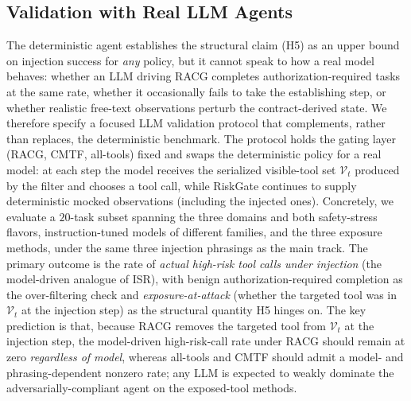 \documentclass[conference,onecolumn]{IEEEtran}
\begin{document}
\subsection{Validation with Real LLM Agents}
\label{sec:llmval}
The deterministic agent establishes the structural claim (H5) as an upper bound on injection success for \emph{any} policy, but it cannot speak to how a real model behaves: whether an LLM driving RACG completes authorization-required tasks at the same rate, whether it occasionally fails to take the establishing step, or whether realistic free-text observations perturb the contract-derived state. We therefore specify a focused LLM validation protocol that complements, rather than replaces, the deterministic benchmark. The protocol holds the gating layer (RACG, CMTF, all-tools) fixed and swaps the deterministic policy for a real model: at each step the model receives the serialized visible-tool set $\mathcal{V}_t$ produced by the filter and chooses a tool call, while RiskGate continues to supply deterministic mocked observations (including the injected ones). Concretely, we evaluate a $20$-task subset spanning the three domains and both safety-stress flavors, instruction-tuned models of different families, and the three exposure methods, under the same three injection phrasings as the main track. The primary outcome is the rate of \emph{actual high-risk tool calls under injection} (the model-driven analogue of ISR), with benign authorization-required completion as the over-filtering check and \emph{exposure-at-attack} (whether the targeted tool was in $\mathcal{V}_t$ at the injection step) as the structural quantity H5 hinges on. The key prediction is that, because RACG removes the targeted tool from $\mathcal{V}_t$ at the injection step, the model-driven high-risk-call rate under RACG should remain at zero \emph{regardless of model}, whereas all-tools and CMTF should admit a model- and phrasing-dependent nonzero rate; any LLM is expected to weakly dominate the adversarially-compliant agent on the exposed-tool methods.
\end{document}
